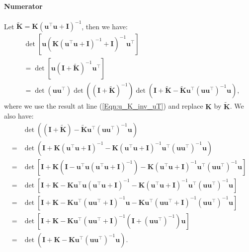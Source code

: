 \paragraph{Numerator}
Let $\widetilde{\mathbf{K}} = \mathbf{K} (\mathbf{u}^\top \mathbf{u} + \mathbf{I})^{-1}$, then we have:
\begin{align*}
    &\det [\mathbf{u}\left(\mathbf{K}(\mathbf{u}^\top\mathbf{u}+\mathbf{I})^{-1} + \mathbf{I}\right)^{-1}\mathbf{u}^\top] 
    \\
    &= \det [\mathbf{u}\left( \mathbf{I}+\widetilde{\mathbf{K}} \right)^{-1}\mathbf{u}^\top] 
    \\
    & = \det (\mathbf{u} \mathbf{u}^\top) \det \left((\mathbf{I}+\widetilde{\mathbf{K}})^{-1}\right) \det \left( \mathbf{I} + \widetilde{\mathbf{K}} - \widetilde{\mathbf{K}}\mathbf{u}^\top (\mathbf{u} \mathbf{u}^\top)^{-1} \mathbf{u}\right),
\end{align*}
where we use the result at line  (\ref{Eqn:u_K_inv_uT}) and replace $\mathbf{K}$ by $\widetilde{\mathbf{K}}$. We also have: 
\begin{align*}
    & \det \left( (\mathbf{I} + \widetilde{\mathbf{K}}) - \widetilde{\mathbf{K}}\mathbf{u}^\top (\mathbf{u} \mathbf{u}^\top)^{-1} \mathbf{u}\right)
\\
    = &\det \left( \mathbf{I} + \mathbf{K} (\mathbf{u}^\top \mathbf{u} + \mathbf{I})^{-1} - \mathbf{K} (\mathbf{u}^\top \mathbf{u} + \mathbf{I})^{-1}\mathbf{u}^\top (\mathbf{u} \mathbf{u}^\top)^{-1} \mathbf{u}\right)
\\
    = &  \det \left[ \mathbf{I} + \mathbf{K} \left( \mathbf{I} - \mathbf{u}^\top \mathbf{u} (\mathbf{u}^\top \mathbf{u} + \mathbf{I})^{-1} \right) - \mathbf{K} (\mathbf{u}^\top \mathbf{u} + \mathbf{I})^{-1}\mathbf{u}^\top (\mathbf{u} \mathbf{u}^\top)^{-1} \mathbf{u}\right] 
\\
    = &  \det \left[ \mathbf{I} + \mathbf{K} - \mathbf{K} \mathbf{u}^\top \mathbf{u} (\mathbf{u}^\top \mathbf{u} + \mathbf{I})^{-1}  - \mathbf{K} (\mathbf{u}^\top \mathbf{u} + \mathbf{I})^{-1}\mathbf{u}^\top (\mathbf{u} \mathbf{u}^\top)^{-1} \mathbf{u}\right] 
\\
    = &  \det \left[ \mathbf{I} + \mathbf{K} - \mathbf{K} \mathbf{u}^\top (\mathbf{u} \mathbf{u}^\top + \mathbf{I})^{-1}\mathbf{u}  - \mathbf{K} \mathbf{u}^\top ( \mathbf{u}\mathbf{u}^\top + \mathbf{I})^{-1} (\mathbf{u} \mathbf{u}^\top)^{-1} \mathbf{u}\right] 
\\ 
    = &  \det \left[ \mathbf{I} + \mathbf{K} - \mathbf{K} \mathbf{u}^\top (\mathbf{u} \mathbf{u}^\top + \mathbf{I})^{-1} \left( \mathbf{I} + (\mathbf{u} \mathbf{u}^\top)^{-1} \right)  \mathbf{u} \right] 
\\ 
    = &  \det \left( \mathbf{I} + \mathbf{K} - \mathbf{K} \mathbf{u}^\top (\mathbf{u} \mathbf{u}^\top)^{-1}  \mathbf{u} \right).
\end{align*}
